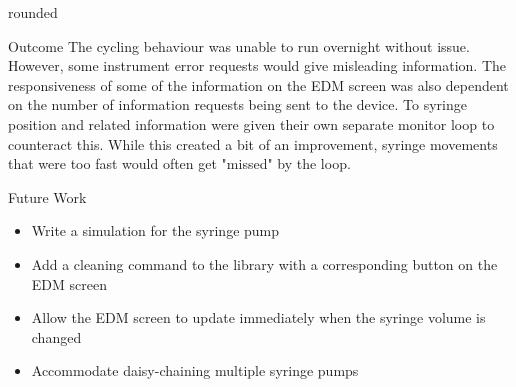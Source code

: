 \documentclass[a0paper,landscape,fontscale=0.32]{baposter}
\begin{document}
\begin{poster}
\begin{posterbox}[name=edmimage,column=3,below=edmscreens,headerfont={},headershape=rounded,boxheaderheight=0em,boxColorOne=white,borderColor=white]{rounded}
\begin{figure}[H]
\begin{center}
\vspace{-1.2em}
\end{center}
\end{figure}
\end{posterbox}
\begin{posterbox}[name=outcome,column=3,below=edmimage]{Outcome}
The cycling behaviour was unable to run overnight without issue. However, some instrument error requests would
give misleading information. The responsiveness of some of the information on the EDM screen was also
    dependent on the number of information requests being sent to the device. To syringe position and related
    information were given their own separate monitor loop to counteract this. While this created a bit of an
    improvement, syringe movements that were too fast would often get "missed" by the loop. 
\end{posterbox}
\begin{posterbox}[name=futurework,column=3,above=bottom]{Future Work}
 \begin{itemize}
    \item Write a simulation for the syringe pump
    \item Add a cleaning command to the library with a corresponding button on the EDM screen
    \item Allow the EDM screen to update immediately when the syringe volume is changed
    \item Accommodate daisy-chaining multiple syringe pumps
\end{itemize}
\end{posterbox}

\end{poster}
\end{document}
